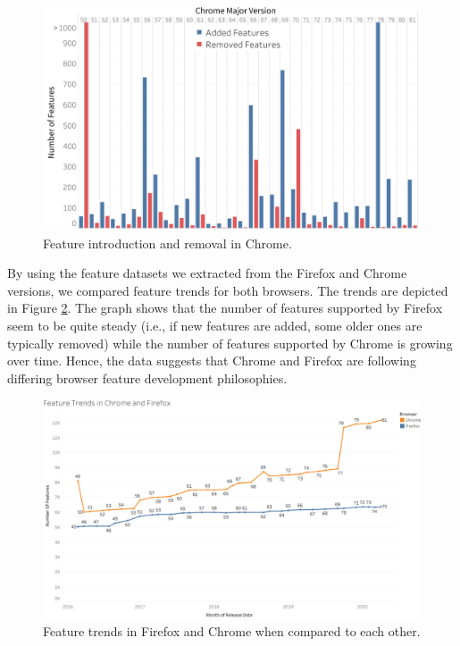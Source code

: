 \begin{figure}[ht]
    \centering
    \includegraphics[width=\columnwidth]{figures/Chrome-add-remove.png}
    \caption{Feature introduction and removal in Chrome.}
    \label{fig:chaddremove}
\end{figure}

By using the feature datasets we extracted from the Firefox and Chrome
versions, we compared feature trends for both browsers. The trends are
depicted in Figure \ref{fig:featuretrends}. The graph shows that the
  number of features supported by Firefox seem to be quite steady
  (i.e., if new features are added, some older ones are typically
  removed) while the number of features supported by Chrome is growing
  over time. Hence, the data suggests that Chrome and Firefox are
  following differing browser feature development philosophies.

\begin{figure}[ht]
    \centering
    \includegraphics[width=\columnwidth]{figures/Feature-Trends.PNG}
    \caption{Feature trends in Firefox and Chrome when compared to
      each other.}
    \label{fig:featuretrends}
\end{figure}
